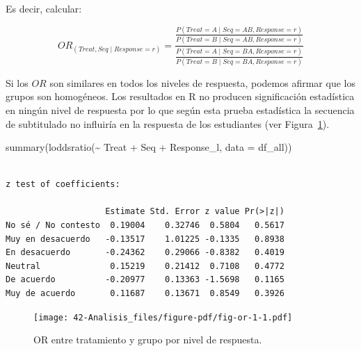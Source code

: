 \documentclass[
  12pt,
  a4paper,
  extrafontsizes,
  onecolumn,
  openright]{memoir}
\newenvironment{Shaded}{\begin{snugshade}}{\end{snugshade}}
\newcommand{\AttributeTok}[1]{\textcolor[rgb]{0.40,0.45,0.13}{#1}}
\newcommand{\FunctionTok}[1]{\textcolor[rgb]{0.28,0.35,0.67}{#1}}
\newcommand{\NormalTok}[1]{\textcolor[rgb]{0.00,0.23,0.31}{#1}}
\newcommand{\SpecialCharTok}[1]{\textcolor[rgb]{0.37,0.37,0.37}{#1}}
\begin{document}
Es decir, calcular:

\begin{equation}
OR_{(Treat, Seq \mid Response=r)}=\frac{
    \frac{
            P(Treat=A \mid Seq=AB, Response=r)
        }{
            P(Treat=B \mid Seq=AB, Response=r)
        }
    }
    {\frac{
        P(Treat=A \mid Seq=BA, Response=r)
        }{
        P(Treat=B \mid Seq=BA, Response=r)
    }
}
\end{equation}

Si los \(OR\) son similares en todos los niveles de respuesta, podemos
afirmar que los grupos son homogéneos. Los resultados en R no producen
significación estadística en ningún nivel de respuesta por lo que según
esta prueba estadística la secuencia de subtitulado no influiría en la
respuesta de los estudiantes (ver Figura~\ref{fig-or-1}).

\scriptsize

\begin{Shaded}
\begin{Highlighting}[]
\FunctionTok{summary}\NormalTok{(}\FunctionTok{loddsratio}\NormalTok{(}\SpecialCharTok{\textasciitilde{}}\NormalTok{ Treat }\SpecialCharTok{+}\NormalTok{ Seq }\SpecialCharTok{+}\NormalTok{ Response\_l, }\AttributeTok{data =}\NormalTok{ df\_all))}
\end{Highlighting}
\end{Shaded}

\begin{verbatim}

z test of coefficients:

                    Estimate Std. Error z value Pr(>|z|)
No sé / No contesto  0.19004    0.32746  0.5804   0.5617
Muy en desacuerdo   -0.13517    1.01225 -0.1335   0.8938
En desacuerdo       -0.24362    0.29066 -0.8382   0.4019
Neutral              0.15219    0.21412  0.7108   0.4772
De acuerdo          -0.20977    0.13363 -1.5698   0.1165
Muy de acuerdo       0.11687    0.13671  0.8549   0.3926
\end{verbatim}

\normalsize

\begin{figure}[h]

{\centering \texttt{[image: 42-Analisis\_files/figure-pdf/fig-or-1-1.pdf]}

}

\caption{\label{fig-or-1}OR entre tratamiento y grupo por nivel de
respuesta.}

\end{figure}
\end{document}
